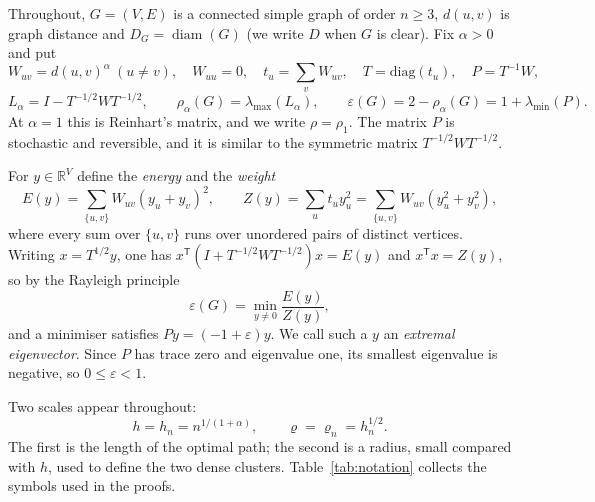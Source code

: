 \documentclass[11pt,a4paper]{article}
\theoremstyle{definition}
\newcommand{\eps}{\varepsilon}
\newcommand{\diam}{\operatorname{diam}}
\newcommand{\R}{\mathbb R}
\begin{document}
Throughout, $G=(V,E)$ is a connected simple graph of order $n\ge3$, $d(u,v)$ is graph distance and $D_G=\diam(G)$ (we write $D$ when $G$ is clear). Fix $\alpha>0$ and put
\[
 W_{uv}=d(u,v)^\alpha\ (u\ne v),\quad W_{uu}=0,\quad t_u=\sum_v W_{uv},\quad T=\mathrm{diag}(t_u),\quad P=T^{-1}W,
\]
\[
 L_\alpha=I-T^{-1/2}WT^{-1/2},\qquad \rho_\alpha(G)=\lambda_{\max}(L_\alpha),\qquad \eps(G)=2-\rho_\alpha(G)=1+\lambda_{\min}(P).
\]
At $\alpha=1$ this is Reinhart's matrix, and we write $\rho=\rho_1$. The matrix $P$ is stochastic and reversible, and it is similar to the symmetric matrix $T^{-1/2}WT^{-1/2}$.

For $y\in\R^V$ define the \emph{energy} and the \emph{weight}
\[
 E(y)=\sum_{\{u,v\}}W_{uv}(y_u+y_v)^2,\qquad Z(y)=\sum_u t_u y_u^2=\sum_{\{u,v\}}W_{uv}(y_u^2+y_v^2),
\]
where every sum over $\{u,v\}$ runs over unordered pairs of distinct vertices. Writing $x=T^{1/2}y$, one has $x^{\mathsf T}(I+T^{-1/2}WT^{-1/2})x=E(y)$ and $x^{\mathsf T}x=Z(y)$, so by the Rayleigh principle
\begin{equation}\label{eq:var}
 \eps(G)=\min_{y\ne0}\frac{E(y)}{Z(y)},
\end{equation}
and a minimiser satisfies $Py=(-1+\eps)y$. We call such a $y$ an \emph{extremal eigenvector}. Since $P$ has trace zero and eigenvalue one, its smallest eigenvalue is negative, so $0\le\eps<1$.

Two scales appear throughout:
\[
 h=h_n=n^{1/(1+\alpha)},\qquad \varrho=\varrho_n=h_n^{1/2}.
\]
The first is the length of the optimal path; the second is a radius, small compared with $h$, used to define the two dense clusters. Table~\ref{tab:notation} collects the symbols used in the proofs.
\end{document}
